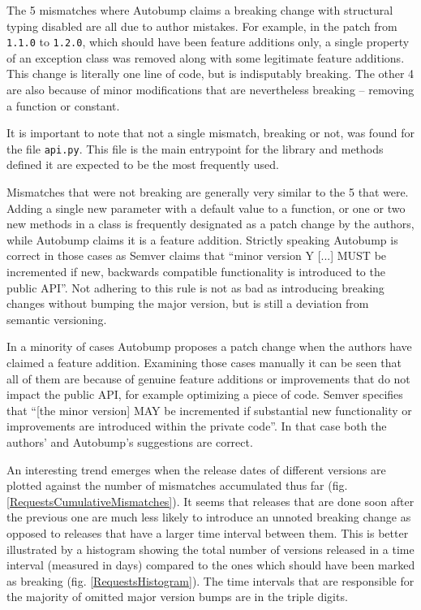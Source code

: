 \documentclass{l4proj}
\newcommand\genericstyle{\lstset{basicstyle=\ttm}}
\newcommand\codeinline[1]{{\genericstyle\lstinline!#1!}}
\begin{document}
The 5 mismatches where Autobump claims a breaking change with
structural typing disabled are all due to author mistakes. For
example, in the patch from \codeinline{1.1.0} to \codeinline{1.2.0},
which should have been feature additions only, a single property of an
exception class was removed along with some legitimate feature
additions. This change is literally one line of code, but is
indisputably breaking. The other 4 are also because of minor
modifications that are nevertheless breaking -- removing a function or constant.

It is important to note that not a single mismatch, breaking or not,
was found for the file \codeinline{api.py}. This file is the main
entrypoint for the library and methods defined it are expected to be
the most frequently used.

Mismatches that were not breaking are generally very similar to the 5
that were. Adding a single new parameter with a default value to a
function, or one or two new methods in a class is frequently
designated as a patch change by the authors, while Autobump claims it
is a feature addition. Strictly speaking Autobump is correct in those
cases as Semver claims that ``minor version Y [...] MUST be
incremented if new, backwards compatible functionality is introduced
to the public API''. Not adhering to this rule is not as bad as
introducing breaking changes without bumping the major version, but is
still a deviation from semantic versioning.

In a minority of cases Autobump proposes a patch change when the
authors have claimed a feature addition. Examining those cases
manually it can be seen that all of them are because of genuine
feature additions or improvements that do not impact the public API,
for example optimizing a piece of code. Semver specifies that ``[the
minor version] MAY be incremented if substantial new functionality or
improvements are introduced within the private code''. In that case
both the authors' and Autobump's suggestions are correct.

An interesting trend emerges when the release dates of different
versions are plotted against the number of mismatches accumulated thus
far (fig. \ref{RequestsCumulativeMismatches}). It seems that releases
that are done soon after the previous one are much less likely to
introduce an unnoted breaking change as opposed to releases that have
a larger time interval between them. This is better illustrated by a
histogram showing the total number of versions released in a time
interval (measured in days) compared to the ones which should have
been marked as breaking (fig. \ref{RequestsHistogram}). The time
intervals that are responsible for the majority of omitted major
version bumps are in the triple digits.
\end{document}

